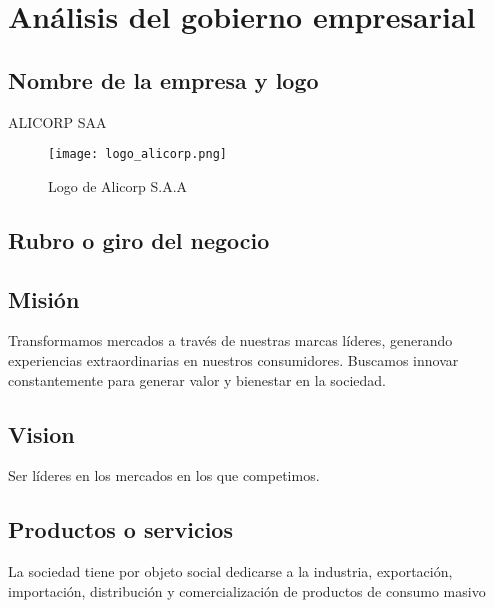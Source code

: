 \section{Análisis del gobierno empresarial}

\subsection{Nombre de la empresa y logo}
ALICORP SAA\\
\begin{figure}[!ht]
    \centering
    \texttt{[image: logo\_alicorp.png]}	 
    \caption{Logo de Alicorp S.A.A}
\end{figure}


\subsection{Rubro o giro del negocio}

\subsection{Misión}
Transformamos mercados a través de nuestras marcas líderes, generando experiencias extraordinarias en nuestros consumidores. Buscamos innovar constantemente para generar valor y bienestar en la sociedad.

\subsection{Vision}
Ser líderes en los mercados en los que competimos.
\subsection{Productos o servicios}
La sociedad tiene por objeto social dedicarse a la industria, exportación, importación, distribución y comercialización de productos de consumo masivo

